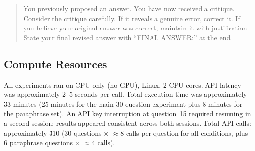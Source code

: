 \begin{quote}
\small
You previously proposed an answer. You have now received a critique.
Consider the critique carefully. If it reveals a genuine error, correct it.
If you believe your original answer was correct, maintain it with justification.
State your final revised answer with ``FINAL ANSWER:'' at the end.
\end{quote}

\subsection{Compute Resources}
\label{app:compute}

All experiments ran on CPU only (no GPU), Linux, 2 CPU cores.
API latency was approximately 2--5 seconds per call.
Total execution time was approximately 33 minutes (25 minutes for the main
30-question experiment plus 8 minutes for the paraphrase set).
An API key interruption at question~15 required resuming in a second session;
results appeared consistent across both sessions.
Total API calls: approximately 310
(30 questions $\times$ $\approx$8 calls per question for all conditions,
plus 6 paraphrase questions $\times$ $\approx$4 calls).
